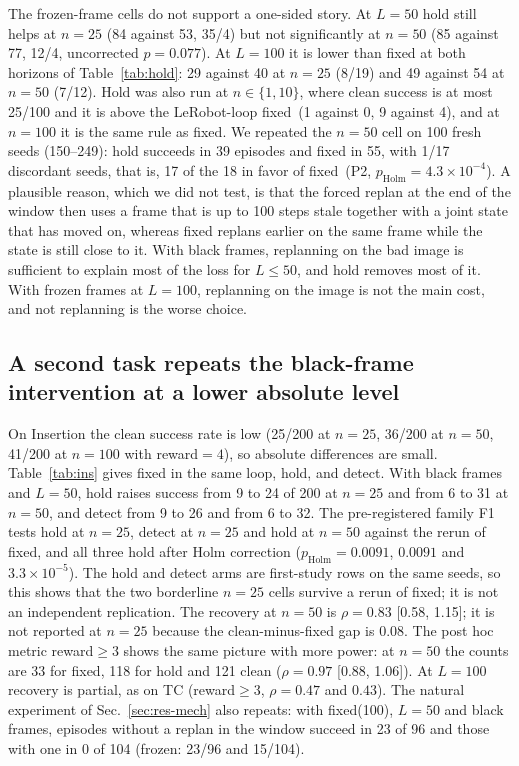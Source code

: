 \documentclass[11pt]{article}
\newcommand{\hold}{\textsf{hold}\xspace}
\newcommand{\fixed}{\textsf{fixed}\xspace}
\newcommand{\detect}{\textsf{detect}\xspace}
\begin{document}
The frozen-frame cells do not support a one-sided story. At $L{=}50$ hold still helps at $n{=}25$ (84 against 53, 35/4) but not significantly at $n{=}50$ (85 against 77, 12/4, uncorrected $p=0.077$). At $L{=}100$ it is lower than \fixed at both horizons of Table~\ref{tab:hold}: 29 against 40 at $n{=}25$ (8/19) and 49 against 54 at $n{=}50$ (7/12). Hold was also run at $n\in\{1,10\}$, where clean success is at most 25/100 and it is above the LeRobot-loop \fixed\ (1 against 0, 9 against 4), and at $n{=}100$ it is the same rule as \fixed. We repeated the $n{=}50$ cell on 100 fresh seeds (150--249): hold succeeds in 39 episodes and \fixed in 55, with 1/17 discordant seeds, that is, 17 of the 18 in favor of \fixed\ (P2, $p_{\mathrm{Holm}}=4.3\times10^{-4}$). A plausible reason, which we did not test, is that the forced replan at the end of the window then uses a frame that is up to 100 steps stale together with a joint state that has moved on, whereas \fixed replans earlier on the same frame while the state is still close to it. With black frames, replanning on the bad image is sufficient to explain most of the loss for $L\le50$, and \hold removes most of it. With frozen frames at $L{=}100$, replanning on the image is not the main cost, and not replanning is the worse choice.

\subsection{A second task repeats the black-frame intervention at a lower absolute level}
\label{sec:res-ins}

On Insertion the clean success rate is low (25/200 at $n{=}25$, 36/200 at $n{=}50$, 41/200 at $n{=}100$ with reward${=}4$), so absolute differences are small. Table~\ref{tab:ins} gives \fixed in the same loop, \hold, and \detect. With black frames and $L{=}50$, hold raises success from 9 to 24 of 200 at $n{=}25$ and from 6 to 31 at $n{=}50$, and \detect from 9 to 26 and from 6 to 32. The pre-registered family F1 tests hold at $n{=}25$, \detect at $n{=}25$ and hold at $n{=}50$ against the rerun of \fixed, and all three hold after Holm correction ($p_{\mathrm{Holm}}=0.0091$, $0.0091$ and $3.3\times10^{-5}$). The hold and \detect arms are first-study rows on the same seeds, so this shows that the two borderline $n{=}25$ cells survive a rerun of \fixed; it is not an independent replication. The recovery at $n{=}50$ is $\rho=0.83$ [0.58, 1.15]; it is not reported at $n{=}25$ because the clean-minus-fixed gap is 0.08. The post hoc metric reward${\ge}3$ shows the same picture with more power: at $n{=}50$ the counts are 33 for \fixed, 118 for \hold and 121 clean ($\rho=0.97$ [0.88, 1.06]). At $L{=}100$ recovery is partial, as on TC (reward${\ge}3$, $\rho=0.47$ and $0.43$). The natural experiment of Sec.~\ref{sec:res-mech} also repeats: with \fixed(100), $L{=}50$ and black frames, episodes without a replan in the window succeed in 23 of 96 and those with one in 0 of 104 (frozen: 23/96 and 15/104).
\end{document}
